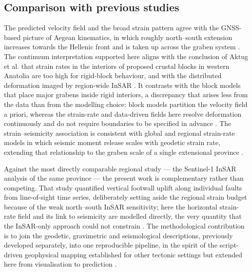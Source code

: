 \documentclass[pdflatex,sn-mathphys-num]{sn-jnl}%
\theoremstyle{thmstyleone}%
\theoremstyle{thmstyletwo}%
\theoremstyle{thmstylethree}%
\begin{document}
\subsection{Comparison with previous studies}\label{sec:compare-lit}
The predicted velocity field and the broad strain pattern agree with the GNSS-based
picture of Aegean kinematics, in which roughly north--south extension increases towards
the Hellenic front and is taken up across the graben system
\cite{Aktug2009,England2016,Walters2011,Hussain2016,Cakir2005,McNab2018,Floyd2010}. The continuum interpretation
supported here aligns with the conclusion of Aktug et al. that strain rates in the
interiors of proposed crustal blocks in western Anatolia are too high for rigid-block
behaviour, and with the distributed deformation imaged by region-wide InSAR
\cite{Aktug2009,Weiss2020,Ergintav2023}. It contrasts with the block models that place
major grabens inside rigid interiors, a discrepancy that arises less from the data than
from the modelling choice: block models partition the velocity field a priori, whereas
the strain-rate and data-driven fields here resolve deformation continuously and do not
require boundaries to be specified in advance \cite{NystThatcher2004,Reilinger2006,Ozdemir2019,Ozbey2024,Poyraz2019,PerouseVernant2012}.
The strain--seismicity association is consistent with global and regional strain-rate
models in which seismic moment release scales with geodetic strain rate, extending that
relationship to the graben scale of a single extensional province
\cite{Kreemer2014,ManaughKreemer2018,Bahrami2021}.

Against the most directly comparable regional study --- the Sentinel-1 InSAR analysis of
the same province --- the present work is complementary rather than competing. That study
quantified vertical footwall uplift along individual faults from line-of-sight time
series, deliberately setting aside the regional strain budget because of the weak
north--south InSAR sensitivity; here the horizontal strain-rate field and its link to
seismicity are modelled directly, the very quantity that the InSAR-only approach could
not constrain \cite{Diercks2024,Wright2004,Yang2020}. The methodological contribution is
to join the geodetic, gravimetric and seismological descriptions, previously developed
separately, into one reproducible pipeline, in the spirit of the script-driven
geophysical mapping established for other tectonic settings but extended here from
visualisation to prediction \cite{Wessel2019,Sandwell2014,Lemenkova202215,Diercks2024,Weiss2020,Kurt2023,Ergintav2023}.
\end{document}
